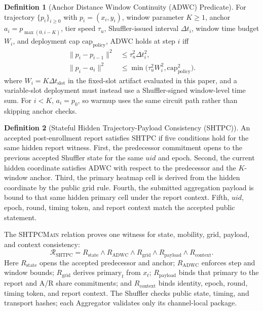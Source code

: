 \documentclass[journal]{IEEEtran}
\theoremstyle{definition}
\newtheorem{definition}{Definition}
\theoremstyle{plain}
\begin{document}
\begin{definition}[Anchor Distance Window Continuity (ADWC) Predicate]
  \label{def:adwc}
  For trajectory \(\{p_i\}_{i\ge0}\) with \(p_i=(x_i,y_i)\), window parameter
  \(K\ge1\), anchor \(a_i=p_{\max(0,i-K)}\), tier speed \(\tau_u\),
  Shuffler-issued interval \(\Delta t_i\), window time budget \(W_i\), and
  deployment cap \(\mathrm{cap}_{\mathrm{policy}}\), ADWC holds at step \(i\)
  iff
  \begin{equation}
    \begin{aligned}
      \|p_i-p_{i-1}\|^2 &\le \tau_u^2\Delta t_i^2,\\
      \|p_i-a_i\|^2 &\le
      \min\bigl(\tau_u^2 W_i^2,
      \mathrm{cap}_{\mathrm{policy}}^2\bigr).
    \end{aligned}
  \end{equation}
\noindent where \(W_i=K\Delta t_{\mathrm{slot}}\) in the fixed-slot artifact
  evaluated in this paper, and a variable-slot deployment must instead use a
  Shuffler-signed window-level time sum. For \(i<K\), \(a_i=p_0\), so warmup
  uses the same circuit path rather than skipping anchor checks.
\end{definition}

\begin{definition}[Stateful Hidden Trajectory-Payload Consistency (SHTPC)]
  \label{def:shtpc}
  An accepted post-enrollment report satisfies SHTPC if five conditions hold for
  the same hidden report witness. First, the predecessor commitment opens to the
  previous accepted Shuffler state for the same \(uid\) and epoch. Second, the
  current hidden coordinate satisfies ADWC with respect to the predecessor and
  the \(K\)-window anchor. Third, the primary heatmap cell is derived from the
  hidden coordinate by the public grid rule. Fourth, the submitted aggregation
  payload is bound to that same hidden primary cell under the report context.
  Fifth, \(uid\), epoch, round, timing token, and report context match the
  accepted public statement.
\end{definition}

The \textsc{SHTPCMain} relation proves one witness for state, mobility, grid,
payload, and context consistency:
\begin{equation}
  \label{eq:r-shtpc}
  \mathcal{R}_{\mathrm{SHTPC}}=
  R_{\mathrm{state}}\land R_{\mathrm{ADWC}}\land R_{\mathrm{grid}}
  \land R_{\mathrm{payload}}\land R_{\mathrm{context}}.
\end{equation}
Here \(R_{\mathrm{state}}\) opens the accepted predecessor and anchor;
\(R_{\mathrm{ADWC}}\) enforces step and window bounds;
\(R_{\mathrm{grid}}\) derives \(\mathrm{primary}_t\) from \(x_t\);
\(R_{\mathrm{payload}}\) binds that primary to the report and A/R share
commitments; and \(R_{\mathrm{context}}\) binds identity, epoch, round, timing
token, and report context. The Shuffler checks public state, timing, and
transport hashes; each Aggregator validates only its channel-local package.
\end{document}
